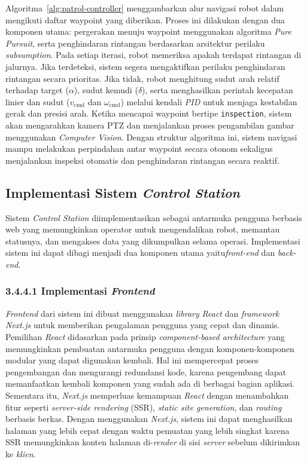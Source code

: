 Algoritma~\ref{alg:patrol-controller} menggambarkan alur navigasi robot dalam mengikuti daftar waypoint yang diberikan. Proses ini dilakukan dengan dua komponen utama: pergerakan menuju waypoint menggunakan algoritma \emph{Pure Pursuit}, serta penghindaran rintangan berdasarkan arsitektur perilaku \emph{subsumption}.  Pada setiap iterasi, robot memeriksa apakah terdapat rintangan di jalurnya. Jika terdeteksi, sistem segera mengaktifkan perilaku penghindaran rintangan secara prioritas. Jika tidak, robot menghitung sudut arah relatif terhadap target (\(\alpha\)), sudut kemudi (\(\delta\)), serta menghasilkan perintah kecepatan linier dan sudut (\(v_{\text{cmd}}\) dan \(\omega_{\text{cmd}}\)) melalui kendali \emph{PID} untuk menjaga kestabilan gerak dan presisi arah. Ketika mencapai waypoint bertipe \texttt{inspection}, sistem akan mengarahkan kamera PTZ dan menjalankan proses pengambilan gambar menggunakan \emph{Computer Vision}. Dengan struktur algoritma ini, sistem navigasi mampu melakukan perpindahan antar waypoint secara otonom sekaligus menjalankan inspeksi otomatis dan penghindaran rintangan secara reaktif.


\subsection{Implementasi Sistem \emph{Control Station}}
Sistem \emph{Control Station} diimplementasikan sebagai antarmuka pengguna berbasis web yang memungkinkan operator untuk mengendalikan robot, memantau statusnya, dan mengakses data yang dikumpulkan selama operasi. Implementasi sistem ini dapat dibagi menjadi dua komponen utama yaitu\emph{front-end} dan \emph{back-end}.

\subsubsection{3.4.4.1 Implementasi \emph{Frontend}}
\emph{Frontend} dari sistem ini dibuat menggunakan \emph{library} \emph{React} dan \emph{framework} \emph{Next.js} untuk memberikan pengalaman pengguna yang cepat dan dinamis. Pemilihan \emph{React} didasarkan pada prinsip \emph{component-based architecture} yang memungkinkan pembuatan antarmuka pengguna dengan komponen-komponen modular yang dapat digunakan kembali. Hal ini mempercepat proses pengembangan dan mengurangi redundansi kode, karena pengembang dapat memanfaatkan kembali komponen yang sudah ada di berbagai bagian aplikasi. Sementara itu, \emph{Next.js} memperluas kemampuan \emph{React} dengan menambahkan fitur seperti \emph{server-side rendering} (SSR), \emph{static site generation}, dan \emph{routing} berbasis berkas. Dengan menggunakan \emph{Next.js}, sistem ini dapat menghasilkan halaman yang lebih cepat dengan waktu pemuatan yang lebih singkat karena SSR memungkinkan konten halaman di-\emph{render} di sisi \emph{server} sebelum dikirimkan ke \emph{klien}.

